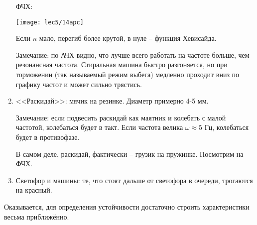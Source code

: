\documentclass[main.tex]{subfiles}
\begin{document}
\begin{enumerate}[noitemsep]
ФЧХ:

\texttt{[image: lec5/14apc]}

Если $n$ мало, перегиб более крутой, в нуле -- функция Хевисайда.

Замечание: по АЧХ видно, что лучше всего работать на частоте больше, чем резонансная частота.
Стиральная машина быстро разгоняется, но при торможении (так называемый режим выбега) медленно проходит вниз по графику частот и может сильно трястись.

\item <<Раскидай>>: мячик на резинке. Диаметр примерно 4-5 мм.

Замечание: если подвесить раскидай как маятник и колебать с малой частотой, колебаться будет в такт.
Если частота велика $ \omega \approx 5 $ Гц, колебаться будет в противофазе.

В самом деле, раскидай, фактически -- грузик на пружинке.
Посмотрим на ФЧХ.

\item Светофор и машины: те, что стоят дальше от светофора в очереди, трогаются на красный.

\end{enumerate}

Оказывается, для определения устойчивости достаточно строить характеристики весьма приближённо.
\end{document}

